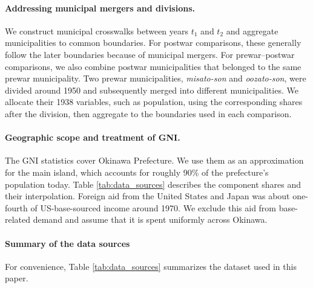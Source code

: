 \documentclass[12pt, unicode, a4paper]{article}
\newcommand{\1}{\mbox{1}\hspace{-0.25em}\mbox{l}} %
\begin{document}
\paragraph{Addressing municipal mergers and divisions.}

We construct municipal crosswalks between years $t_1$ and $t_2$ and aggregate municipalities to common boundaries. For postwar comparisons, these generally follow the later boundaries because of municipal mergers. For prewar--postwar comparisons, we also combine postwar municipalities that belonged to the same prewar municipality.
Two prewar municipalities, \textit{misato-son} and \textit{oozato-son}, were divided around 1950 and subsequently merged into different municipalities. We allocate their 1938 variables, such as population, using the corresponding shares after the division, then aggregate to the boundaries used in each comparison.

\paragraph{Geographic scope and treatment of GNI.}
The GNI statistics cover Okinawa Prefecture. We use them as an approximation for the main island, which accounts for roughly 90\% of the prefecture's population today. Table \ref{tab:data_sources} describes the component shares and their interpolation. Foreign aid from the United States and Japan was about one-fourth of US-base-sourced income around 1970. We exclude this aid from base-related demand and assume that it is spent uniformly across Okinawa.

\paragraph{Summary of the data sources}

For convenience, Table \ref{tab:data_sources} summarizes the dataset used in this paper. 
\end{document}
